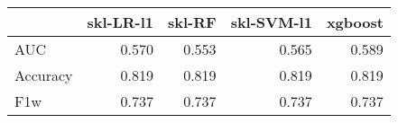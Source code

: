 \begin{tabular}{lrrrr}
\toprule
{} &  skl-LR-l1 &  skl-RF &  skl-SVM-l1 &  xgboost \\
\midrule
AUC      &      0.570 &   0.553 &       0.565 &    0.589 \\
Accuracy &      0.819 &   0.819 &       0.819 &    0.819 \\
F1w      &      0.737 &   0.737 &       0.737 &    0.737 \\
\bottomrule
\end{tabular}

